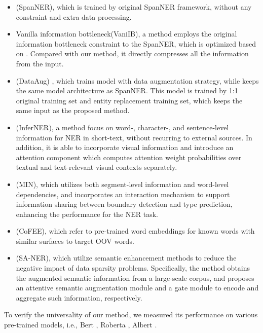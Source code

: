 \documentclass[11pt]{article}
\begin{document}
\begin{itemize}
\item \citet{fu-etal-2021-spanner} (SpanNER), which is trained by original SpanNER framework, without any constraint and extra data processing.  

\item Vanilla information bottleneck(VaniIB), a method employs the original information bottleneck constraint to the SpanNER, which is optimized based on \citet{alemi2016deep}. Compared with our method, it directly compresses all the information from the input.

\item \citet{dai2020analysis} (DataAug) , which trains model with data augmentation strategy, while keeps the same model architecture as SpanNER. This model is trained by 1:1 original training set and entity replacement training set, which keeps the same input as the proposed method.


\item \citet{shahzad2021inferner} (InferNER), a method focus on word-, character-, and sentence-level information for NER in short-text, without recurring to external sources. In addition, it is able to incorporate visual information and introduce an attention component which computes attention weight probabilities over textual and text-relevant visual contexts separately. 

\item \citet{li-etal-2021-modularized} (MIN), which utilizes both segment-level information and word-level dependencies, and incorporates an interaction mechanism to support information sharing between boundary detection and type prediction, enhancing the performance for the NER task.

\item \citet{fukuda-etal-2020-robust} (CoFEE), which refer to pre-trained word embeddings for known words with similar surfaces to target OOV words. 

\item \citet{nie2020named} (SA-NER), which utilize semantic enhancement methods to reduce the negative impact of data sparsity problems. Specifically, the method obtains the augmented semantic information from a large-scale corpus, and proposes an attentive semantic augmentation module and a gate module to encode and aggregate such information, respectively.

\end{itemize}

To verify the universality of our method, we measured its performance on various pre-trained models, i.e., Bert \cite{devlin2018bert},  Roberta \cite{liu2019roberta}, Albert \cite{lan2019albert}.
\end{document}
